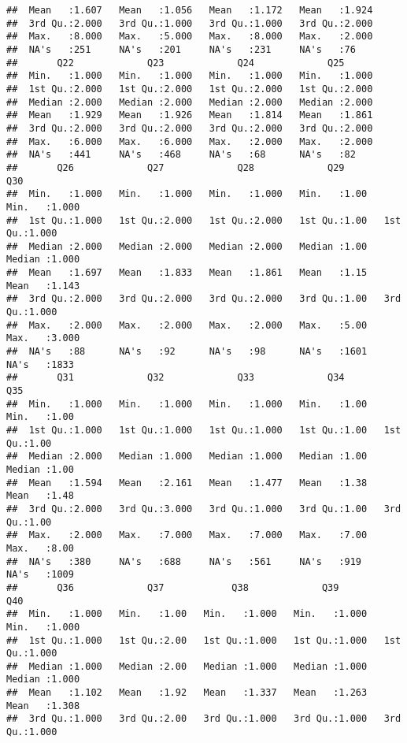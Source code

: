 \documentclass[
]{article}
\begin{document}
\begin{verbatim}
##  Mean   :1.607   Mean   :1.056   Mean   :1.172   Mean   :1.924  
##  3rd Qu.:2.000   3rd Qu.:1.000   3rd Qu.:1.000   3rd Qu.:2.000  
##  Max.   :8.000   Max.   :5.000   Max.   :8.000   Max.   :2.000  
##  NA's   :251     NA's   :201     NA's   :231     NA's   :76     
##       Q22             Q23             Q24             Q25       
##  Min.   :1.000   Min.   :1.000   Min.   :1.000   Min.   :1.000  
##  1st Qu.:2.000   1st Qu.:2.000   1st Qu.:2.000   1st Qu.:2.000  
##  Median :2.000   Median :2.000   Median :2.000   Median :2.000  
##  Mean   :1.929   Mean   :1.926   Mean   :1.814   Mean   :1.861  
##  3rd Qu.:2.000   3rd Qu.:2.000   3rd Qu.:2.000   3rd Qu.:2.000  
##  Max.   :6.000   Max.   :6.000   Max.   :2.000   Max.   :2.000  
##  NA's   :441     NA's   :468     NA's   :68      NA's   :82     
##       Q26             Q27             Q28             Q29            Q30       
##  Min.   :1.000   Min.   :1.000   Min.   :1.000   Min.   :1.00   Min.   :1.000  
##  1st Qu.:1.000   1st Qu.:2.000   1st Qu.:2.000   1st Qu.:1.00   1st Qu.:1.000  
##  Median :2.000   Median :2.000   Median :2.000   Median :1.00   Median :1.000  
##  Mean   :1.697   Mean   :1.833   Mean   :1.861   Mean   :1.15   Mean   :1.143  
##  3rd Qu.:2.000   3rd Qu.:2.000   3rd Qu.:2.000   3rd Qu.:1.00   3rd Qu.:1.000  
##  Max.   :2.000   Max.   :2.000   Max.   :2.000   Max.   :5.00   Max.   :3.000  
##  NA's   :88      NA's   :92      NA's   :98      NA's   :1601   NA's   :1833   
##       Q31             Q32             Q33             Q34            Q35      
##  Min.   :1.000   Min.   :1.000   Min.   :1.000   Min.   :1.00   Min.   :1.00  
##  1st Qu.:1.000   1st Qu.:1.000   1st Qu.:1.000   1st Qu.:1.00   1st Qu.:1.00  
##  Median :2.000   Median :1.000   Median :1.000   Median :1.00   Median :1.00  
##  Mean   :1.594   Mean   :2.161   Mean   :1.477   Mean   :1.38   Mean   :1.48  
##  3rd Qu.:2.000   3rd Qu.:3.000   3rd Qu.:1.000   3rd Qu.:1.00   3rd Qu.:1.00  
##  Max.   :2.000   Max.   :7.000   Max.   :7.000   Max.   :7.00   Max.   :8.00  
##  NA's   :380     NA's   :688     NA's   :561     NA's   :919    NA's   :1009  
##       Q36             Q37            Q38             Q39             Q40       
##  Min.   :1.000   Min.   :1.00   Min.   :1.000   Min.   :1.000   Min.   :1.000  
##  1st Qu.:1.000   1st Qu.:2.00   1st Qu.:1.000   1st Qu.:1.000   1st Qu.:1.000  
##  Median :1.000   Median :2.00   Median :1.000   Median :1.000   Median :1.000  
##  Mean   :1.102   Mean   :1.92   Mean   :1.337   Mean   :1.263   Mean   :1.308  
##  3rd Qu.:1.000   3rd Qu.:2.00   3rd Qu.:1.000   3rd Qu.:1.000   3rd Qu.:1.000  

\end{verbatim}
\end{document}
